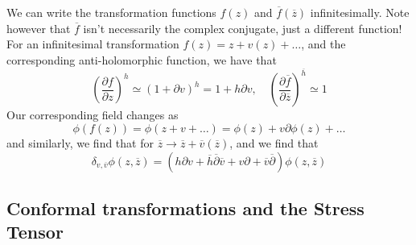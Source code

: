 \documentclass[11pt, oneside]{article}   	%
\theoremstyle{slanted}
\begin{document}
We can write the transformation functions 
$ f \left(  z  \right)  $ and $ \overline{ f } \left( \overline{ z }  \right)  $ 
infinitesimally. Note however that 
$ \overline{ f } $  isn't necessarily the complex 
conjugate, just a different function! 
For an infinitesimal transformation 
$ f \left( z  \right)    = z + v \left( z  \right)   + \dots $, 
and the corresponding anti-holomorphic function, 
we have that 
\[
 \left( \frac{\partial  f }{\partial  z }   \right)  ^{ h } 
 \simeq \left(  1 + \partial  v  \right)  ^{ h }  = 1 + h \partial  v , 
 \quad \left( \frac{\partial \overline{ f } }{\partial \overline{ z }  } \right)
 ^{ \overline{ h } }  \simeq 1
\] Our corresponding field changes as 
\[
	\phi \left( f \left(  z  \right)   \right)   = 
	\phi \left( z + v + \dots  \right)   = 
	\phi \left( z  \right)  + v \partial  \phi \left( z  \right)  + \dots 
\] and similarly, we find that for $\overline{z} \to \overline{ z  } 
+ \overline{ v } \left( \overline{ z   }  \right)  $, 
and we find that 
\[
	\delta _{ v, \overline{ v }  } \phi \left( z, \overline{ z }  \right)  
	 = \left( h \partial  v + \overline{ h } 
	 \overline{ \partial   } \overline{ v } + 
 v \partial  + \overline{ v }  \overline{\partial } \right) \phi \left( z, \overline{  z } \right) 
\] 

\subsection{Conformal transformations and the Stress Tensor}
\end{document}
